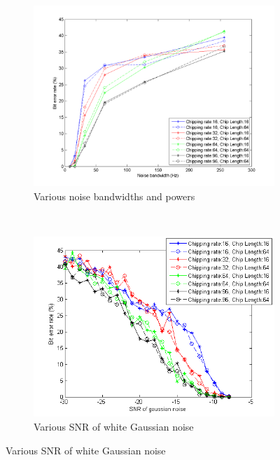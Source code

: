 			\begin{figure}[H]
				\centering
				\begin{subfigure}[b]{0.5\textwidth}
					\includegraphics[width=\textwidth]{imgs/results/plot_mode_dsss-test_bandwidthAndPower-rep_20-dataRate_8-dataLength_128.png}
					\caption{Various noise bandwidths and powers}
					\label{fig:dsss_bandwidth}
				\end{subfigure}%
				~
				\begin{subfigure}[b]{0.5\textwidth}
					\includegraphics[width=\textwidth]{imgs/results/plot_mode_dsss-test_gaussianSNR-rep_20-dataRate_8-dataLength_128_fixedlegend.png}
					\caption{Various SNR of white Gaussian noise}
					\label{fig:dsss_gaussian}
				\end{subfigure}
			\end{figure}		
				
